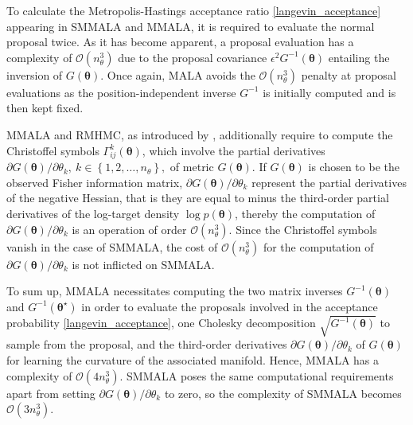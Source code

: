 \documentclass[twoside,11pt]{article}
\begin{document}
To calculate the Metropolis-Hastings acceptance ratio \eqref{langevin_acceptance} appearing in SMMALA and MMALA,
it is required to evaluate the normal proposal twice. As it has become apparent, a proposal evaluation has a complexity of
$\mathcal{O}(n_\theta^3)$ due to the proposal covariance $\epsilon^2 G^{-1}(\boldsymbol{\theta})$ entailing the inversion of 
$G(\boldsymbol{\theta})$. Once again, MALA avoids the $\mathcal{O}(n_\theta^3)$ penalty at proposal evaluations as the
position-independent inverse $G^{-1}$ is initially computed and is then kept fixed.

MMALA and RMHMC, as introduced by \cite{gir_cal__rie}, additionally require to compute the Christoffel symbols 
$\Gamma^{k}_{ij}(\boldsymbol{\theta})$, which involve
the partial derivatives $\partial G(\boldsymbol{\theta})/\partial\theta_k,~k\in\left\{1,2,\dots,n_{\theta}\right\},$
of metric $G(\boldsymbol{\theta})$. If $G(\boldsymbol{\theta})$ is chosen to be the 
observed Fisher information matrix, $\partial G(\boldsymbol{\theta})/\partial\theta_k$ represent the partial derivatives of 
the negative Hessian, that is they are equal to minus the third-order partial derivatives of the log-target density 
$\log{p(\boldsymbol{\theta})}$, thereby the computation of $\partial G(\boldsymbol{\theta})/\partial\theta_k$ is an 
operation of order $\mathcal{O}(n_\theta^3)$. Since the Christoffel symbols vanish in the case of SMMALA, the cost of
$\mathcal{O}(n_\theta^3)$ for the computation of $\partial G(\boldsymbol{\theta})/\partial\theta_k$ is not inflicted on
SMMALA.

To sum up, MMALA necessitates computing the two matrix inverses $G^{-1}(\boldsymbol{\theta})$ and 
$G^{-1}(\boldsymbol{\theta}^{\star})$ in order to evaluate the proposals involved in the acceptance probability 
\eqref{langevin_acceptance}, one Cholesky decomposition $\sqrt{G^{-1}(\boldsymbol{\theta})}$ to sample from the proposal, 
and the third-order derivatives $\partial G(\boldsymbol{\theta})/\partial\theta_k$ of $G(\boldsymbol{\theta})$
for learning the curvature of the associated manifold. Hence, MMALA has a complexity of $\mathcal{O}(4n_\theta^3)$. SMMALA
poses the same computational requirements apart from setting $\partial G(\boldsymbol{\theta})/\partial\theta_k$ to zero, so 
the complexity of SMMALA becomes $\mathcal{O}(3n_\theta^3)$.
\end{document}
